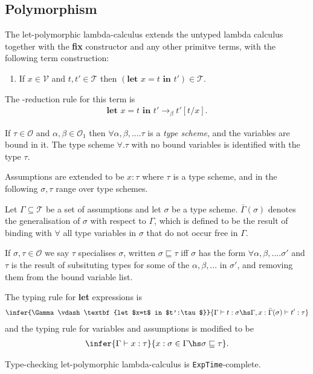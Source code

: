 \documentclass{article}
\begin{document}
\subsection{Polymorphism}

\begin{definition*}
	The let-polymorphic lambda-calculus extends the untyped lambda calculus together with the 
	\textbf{fix} constructor and any other primitve terms, with the following term construction:
	\begin{enumerate}[label=L5.]
		\item If $x\in\mathcal{V}$ and $t,t'\in\mathcal{T}$ then $(\textbf{let $x=t$ in $t'$})\in\mathcal{T}$.
	\end{enumerate}
	The \beta-reduction rule for this term is \begin{align*}
		\textbf{let $x=t$ in $t'\to_\beta t'[t/x]$}.
	\end{align*}
\end{definition*} 

\begin{definition*}
	If $\tau\in\mathcal{O}$ and $\alpha,\beta\in\mathcal{O}_1$ then $\forall \alpha, \beta, ... .\tau$ 
	is a \emph{type scheme}, and the variables are bound in it. The type scheme $\forall.\tau$ with
	no bound variables is identified with the type $\tau$.
	
	Assumptions are extended to be $x:\tau$ where $\tau$ is a type scheme, and in the following $\sigma,\tau$
	range over type schemes.

	Let $\Gamma\subseteq\mathcal{T}$ be a set of assumptions and let $\sigma$ be a type scheme. $\bar\Gamma(\sigma)$ denotes 
	the generalisation of $\sigma$ with respect to $\Gamma$, which is defined to be the result of binding 
	with $\forall$ all type variables in $\sigma$ that do not occur free in $\Gamma$.

	If $\sigma,\tau\in\mathcal{O}$ we say $\tau$ specialises $\sigma$, written $\sigma\sqsubseteq \tau$ 
	iff $\sigma$ has the form $\forall \alpha, \beta, ... .\sigma'$ and $\tau$ is the result of subsituting 
	types for some of the $\alpha,\beta, ...$ in $\sigma'$, and removing them from the bound variable list.

	The typing rule for \textbf{let} expressions is 
	\begin{align*}
		\infer{\Gamma\vdash \textbf{let $x=t$ in $t':\tau$}}{\Gamma\vdash t:\sigma\hs \Gamma,x:\bar\Gamma(\sigma)\vdash t':\tau}
	\end{align*}
	and the typing rule for variables and assumptions is modified to be 
	\begin{align*}
		\infer{\Gamma \vdash x:\tau}{x:\sigma \in \Gamma\hs \sigma\sqsubseteq \tau}.
	\end{align*}
\end{definition*}

\begin{theorem*}[III.27]
	Type-checking let-polymorphic lambda-calculus is \texttt{ExpTime}-complete.
\end{theorem*}
\end{document}
